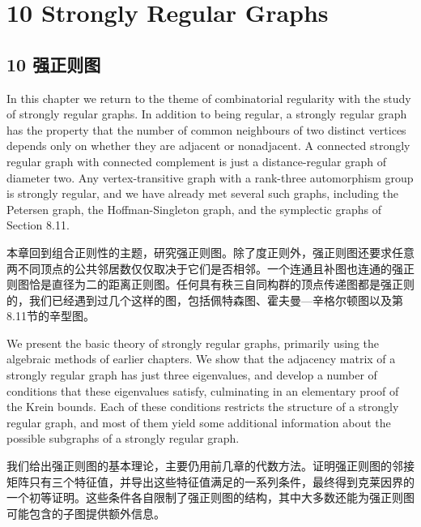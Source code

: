 \documentclass[10pt]{article}
\begin{document}
\section*{10 Strongly Regular Graphs}

\begin{tcolorbox}\relax
\section*{10 强正则图}
\end{tcolorbox}

In this chapter we return to the theme of combinatorial regularity with the study of strongly regular graphs. In addition to being regular, a strongly regular graph has the property that the number of common neighbours of two distinct vertices depends only on whether they are adjacent or nonadjacent. A connected strongly regular graph with connected complement is just a distance-regular graph of diameter two. Any vertex-transitive graph with a rank-three automorphism group is strongly regular, and we have already met several such graphs, including the Petersen graph, the Hoffman-Singleton graph, and the symplectic graphs of Section 8.11.

\begin{tcolorbox}\relax
本章回到组合正则性的主题，研究强正则图。除了度正则外，强正则图还要求任意两不同顶点的公共邻居数仅仅取决于它们是否相邻。一个连通且补图也连通的强正则图恰是直径为二的距离正则图。任何具有秩三自同构群的顶点传递图都是强正则的，我们已经遇到过几个这样的图，包括佩特森图、霍夫曼—辛格尔顿图以及第8.11节的辛型图。
\end{tcolorbox}

We present the basic theory of strongly regular graphs, primarily using the algebraic methods of earlier chapters. We show that the adjacency matrix of a strongly regular graph has just three eigenvalues, and develop a number of conditions that these eigenvalues satisfy, culminating in an elementary proof of the Krein bounds. Each of these conditions restricts the structure of a strongly regular graph, and most of them yield some additional information about the possible subgraphs of a strongly regular graph.

\begin{tcolorbox}\relax
我们给出强正则图的基本理论，主要仍用前几章的代数方法。证明强正则图的邻接矩阵只有三个特征值，并导出这些特征值满足的一系列条件，最终得到克莱因界的一个初等证明。这些条件各自限制了强正则图的结构，其中大多数还能为强正则图可能包含的子图提供额外信息。
\end{tcolorbox}
\end{document}
